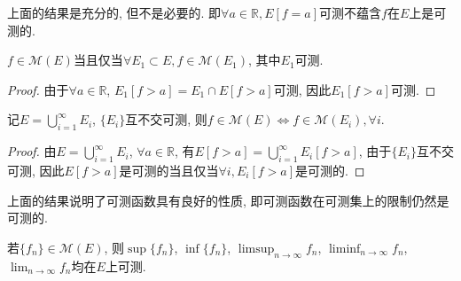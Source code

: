 \documentclass[theorem=false,mathfont=none,openany,sub3section]{easybook}
\begin{document}
\begin{remark}
  上面的结果是充分的, 但不是必要的. 即$\forall a \in \mathbb{R}, E[f=a]$可测不蕴含$f$在$E$上是可测的.\par
\end{remark}

\begin{proposition}
  $f\in \mathcal{M}(E)$当且仅当$\forall E_1\subset E, f\in \mathcal{M}(E_1)$, 其中$E_1$可测.\par
\end{proposition}

\begin{proof}
  由于$\forall a \in \mathbb{R}$, $E_1[f>a]=E_1\cap E[f>a]$可测, 因此$E_1[f>a]$可测.\par
\end{proof}

\begin{proposition}
  记$E=\bigcup_{i=1}^{\infty}E_i$, $\{E_i\}$互不交可测, 则$f\in \mathcal{M}(E)\Leftrightarrow f\in \mathcal{M}(E_i), \forall i$.\par
\end{proposition}

\begin{proof}
  由$E=\bigcup_{i=1}^{\infty}E_i$, $\forall a \in \mathbb{R}$, 有$E[f>a]=\bigcup_{i=1}^{\infty}E_i[f>a]$, 由于$\{E_i\}$互不交可测, 因此$E[f>a]$是可测的当且仅当$\forall i, E_i[f>a]$是可测的.\par
\end{proof}

\begin{remark}
  上面的结果说明了可测函数具有良好的性质, 即可测函数在可测集上的限制仍然是可测的.\par
\end{remark}

\begin{theorem}
  若$\{f_n\}\in \mathcal{M}(E)$, 则$\sup \{f_n\}$, $\inf \{f_n\}$, $\limsup_{n \to \infty} f_n$, $\liminf_{n \to \infty} f_n$, $\lim_{n \to \infty} f_n$均在$E$上可测.\par
\end{theorem}
\end{document}
